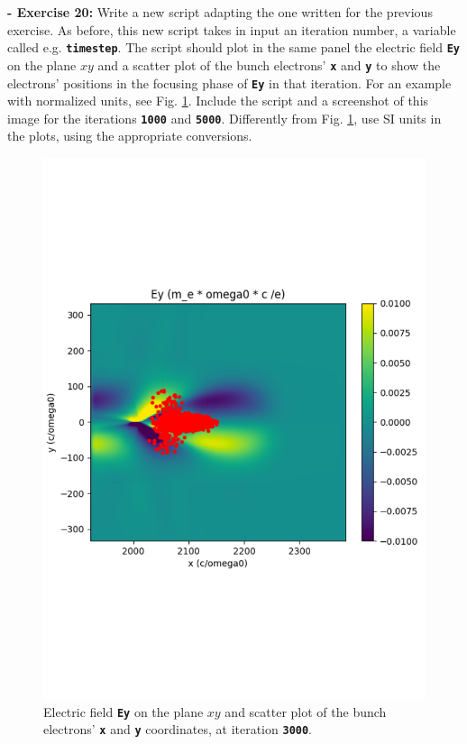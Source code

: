 \documentclass{article}
\newcommand{\commandline}[1]{\texttt{\textbf{#1}}}
\begin{document}
\textbf{- Exercise 20:} Write a new script adapting the one written for the previous exercise. As before, this new script takes in input an iteration number, a variable called e.g. \commandline{timestep}. The script should plot in the same panel the electric field \commandline{Ey} on the plane $xy$ and a scatter plot of the bunch electrons' \commandline{x} and \commandline{y} to show the electrons' positions in the focusing phase of \commandline{Ey} in that iteration. For an example with normalized units, see Fig. \ref{EyScatterXY}. Include the script and a screenshot of this image for the iterations \commandline{1000} and \commandline{5000}. Differently from Fig.  \ref{EyScatterXY}, use SI units in the plots, using the appropriate conversions.

\begin{figure}[h!]
  \begin{center}
  \includegraphics[scale=0.35]{EyScatterXY.pdf}
  \end{center}
  \caption{Electric field \commandline{Ey} on the plane $xy$ and scatter plot of the bunch electrons' \commandline{x} and \commandline{y} coordinates, at iteration \commandline{3000}. }
  \label{EyScatterXY}
\end{figure}
\end{document}
